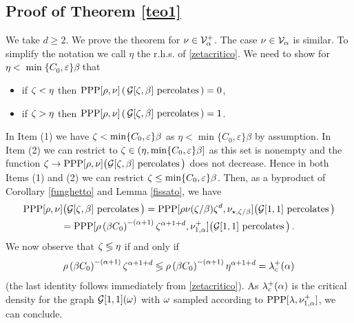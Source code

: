 \documentclass[12pt,a4paper,reqno]{amsart}
\newcommand{\cG}{\ensuremath{\mathcal G}}
\newcommand{\cV}{\ensuremath{\mathcal V}}
\let\a=\alpha \let\b=\beta   \let\d=\delta  \let\e=\varepsilon
\newcommand{\rosso}{\textcolor{black}} %
\newcommand{\orc}{\textcolor{black}} %
\newcommand{\cv}{\rosso{\cV_\alpha}}
\newcommand{\cvp}{\rosso{\cV^+_\alpha}}
\begin{document}
\subsection{Proof of Theorem \ref{teo1}}\label{sec_proof_teo1} We take $d\geq 2$. 
We prove the theorem  for $\nu\in \cvp$. The   case $\nu\in \cv$  is similar.
To simplify the notation we call $\eta$ the r.h.s. of \eqref{zetacritico}.
We need to show  for  \orc{$\eta<  \min\{C_0 , \e\}  \b $}  that 
\begin{itemize}
\item[(1)]  if $\zeta<\eta$ then ${\rm PPP}[\rho,\nu] \left(\, \cG[\z, \b] \text{ percolates}\, \right)=0$, 
\item[(2)] if $\zeta>\eta$ then ${\rm PPP}[\rho,\nu]\left(\, \cG[\z, \b]\text{ percolates}\, \right)=1$.  
\end{itemize}
In Item (1)  we have \orc{$\z <  \min\{C_0 , \e\} \beta$} as $\eta <   \min\{C_0 , \e\} \beta$ by assumption. 
In Item (2) we can   restrict to $\z\in \left(\eta, \min\{C_0 , \e\} \beta\right]$ as this  set  is nonempty and the function  $\z\to  {\rm PPP}[\rho,\nu]\bigl( \cG[\z, \b] \text{ percolates}\, \bigr)$ does not decrease. Hence  in both Items (1) and (2)  we can restrict  $\z \leq \min\{C_0 , \e\} \beta $. Then, as a byproduct of   Corollary \ref{funghetto} and Lemma \ref{fissato}, we have 
  \begin{multline*}
  {\rm PPP} [\rho,\nu] \bigl( \cG[\z, \b] \text{ percolates}\, \bigr)
  = 
 {\rm  PPP}[\rho \nu(\z/\b) \z^d ,\nu_{\star,  \z/\b}] \bigl(  \cG[1, 1]  \text{ percolates}\,\bigr )\\
  ={\rm PPP}[ \rho  \left(  \b C_0  \right) ^{-(\a+1)} \z^{\a+1+d}, \nu^+_{1,\a}]\bigl(  \cG[1, 1]  \text{ percolates}\,\bigr )\,.
 \end{multline*}
 We now observe that $\zeta\lessgtr \eta$ if and only if 
\[  \rho  \left(  \b C_0  \right) ^{-(\a+1)} \z^{\a+1+d} 
\lessgtr  \rho  \left(  \b C_0  \right) ^{-(\a+1)} \eta^{\a+1+d}=\l^+_c(\a)
\]
(the last identity follows immediately from \eqref{zetacritico}). 
  As $\l^+_c(\a)$ is the critical density for the graph  $\cG[1, 1](\o)$ with $\omega$ sampled according to  ${\rm PPP}[\l,\nu^+_{1,\a}] $, we can conclude.
\end{document}
